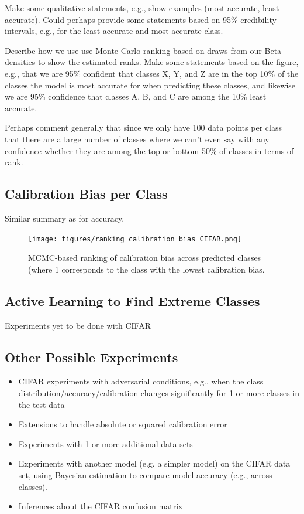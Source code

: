 \documentclass{article}
\begin{document}
Make some qualitative statements, e.g., show examples (most accurate, least accurate). Could perhaps provide some statements based on 95\% credibility intervals, e.g., for the least accurate and most accurate class.

Describe how we use use Monte Carlo ranking \cite{marshall1998league} based on draws from our Beta densities  to show the estimated ranks. Make some statements based on the figure, e.g., that we are 95\% confident that classes X, Y, and Z are in the top 10\% of the classes the model is most accurate for when predicting these classes, and likewise we are 95\% confidence that classes A, B, and C are among the 10\% least accurate.

Perhaps comment generally that since we only have 100 data points per class that there are a large number of classes where we can't even say with any confidence whether they are among the top or bottom 50\% of classes in terms of rank.


\subsection{Calibration Bias per Class}

Similar summary as for accuracy.




\begin{figure}[h]
 \centering
   \texttt{[image: figures/ranking\_calibration\_bias\_CIFAR.png]}   
\caption{MCMC-based ranking of calibration bias across predicted classes (where 1 corresponds to the class with the lowest calibration bias.} 
\label{fig:ranking_bias}
\end{figure}

\subsection{Active Learning to Find Extreme Classes}

Experiments yet to be done with CIFAR


\subsection{Other Possible Experiments}
\begin{itemize}
   \item CIFAR experiments with adversarial conditions, e.g., when the class distribution/accuracy/calibration changes significantly for 1 or more classes in the test data
   \item Extensions to handle absolute or squared calibration error
    \item Experiments with 1 or more additional data sets
    \item Experiments with another model (e.g. a simpler model) on the CIFAR data set, using Bayesian estimation to compare model accuracy (e.g., across classes).
    \item Inferences about the CIFAR confusion matrix 
\end{itemize}
\end{document}
